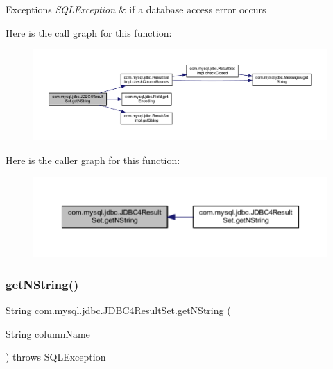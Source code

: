 \begin{DoxyExceptions}{Exceptions}
{\em S\+Q\+L\+Exception} & if a database access error occurs \\
\hline
\end{DoxyExceptions}
Here is the call graph for this function\+:
\nopagebreak
\begin{figure}[H]
\begin{center}
\leavevmode
\includegraphics[width=350pt]{classcom_1_1mysql_1_1jdbc_1_1_j_d_b_c4_result_set_ab4ab66899e61b969bab44eccedad00fb_cgraph}
\end{center}
\end{figure}
Here is the caller graph for this function\+:
\nopagebreak
\begin{figure}[H]
\begin{center}
\leavevmode
\includegraphics[width=350pt]{classcom_1_1mysql_1_1jdbc_1_1_j_d_b_c4_result_set_ab4ab66899e61b969bab44eccedad00fb_icgraph}
\end{center}
\end{figure}
\mbox{\label{classcom_1_1mysql_1_1jdbc_1_1_j_d_b_c4_result_set_a01c74243228097fa36990664acb399bd}} 
\subsubsection{\texorpdfstring{get\+N\+String()}{getNString()}\hspace{0.1cm}{\footnotesize\ttfamily [2/2]}}
{\footnotesize\ttfamily String com.\+mysql.\+jdbc.\+J\+D\+B\+C4\+Result\+Set.\+get\+N\+String (\begin{DoxyParamCaption}\item[{String}]{column\+Name }\end{DoxyParamCaption}) throws S\+Q\+L\+Exception}

